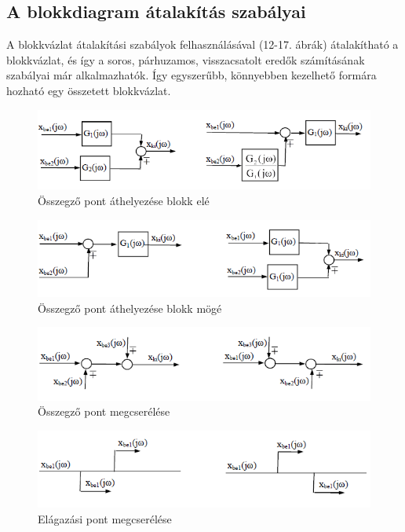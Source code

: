 \documentclass[11pt,a4paper]{article}
\begin{document}
\subsection{A blokkdiagram átalakítás szabályai}
A blokkvázlat átalakítási szabályok felhasználásával (12-17. ábrák) átalakítható
a blokkvázlat, és így a soros, párhuzamos, visszacsatolt eredők számításának szabályai
már alkalmazhatók. Így egyszerűbb, könnyebben kezelhető formára hozható egy összetett blokkvázlat.
\begin{figure}[hbtp]
    	 \centering
		\includegraphics[scale=1.0]{12_osszegzo_blokk_ele.png}
		\caption{Összegző pont áthelyezése blokk elé}
\end{figure}
\begin{figure}[hbtp]
    	 \centering
		\includegraphics[scale=1.0]{13_osszegzo_blokk_moge.png}
		\caption{Összegző pont áthelyezése blokk mögé}
\end{figure}
\begin{figure}[hbtp]
    	 \centering
		\includegraphics[scale=1.0]{14_osszegzo_blokk_megcserel.png}
		\caption{Összegző pont megcserélése}
\end{figure}
\begin{figure}[hbtp]
    	 \centering
		\includegraphics[scale=1.0]{15_elagazas_blokk_megcserel.png}
		\caption{Elágazási pont megcserélése}
\end{figure}
\end{document}
